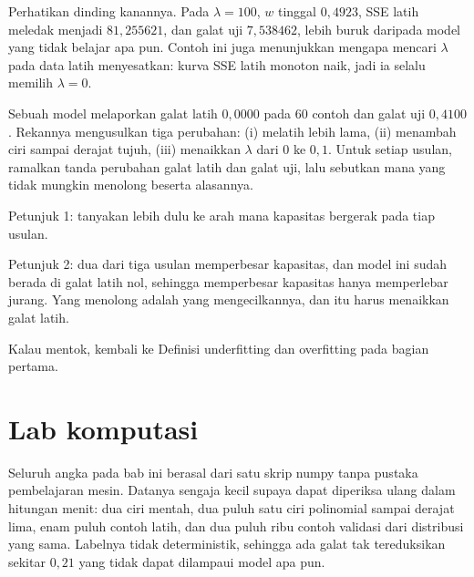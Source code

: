 Perhatikan dinding kanannya. Pada $\lambda=100$, $w$ tinggal $0{,}4923$, SSE latih
meledak menjadi $81{,}255621$, dan galat uji $7{,}538462$, lebih buruk daripada model
yang tidak belajar apa pun. Contoh ini juga menunjukkan mengapa mencari $\lambda$ pada
data latih menyesatkan: kurva SSE latih monoton naik, jadi ia selalu memilih
$\lambda=0$.

\begin{tantangan}
Sebuah model melaporkan galat latih $0{,}0000$ pada $60$ contoh dan galat uji
$0{,}4100$. Rekannya mengusulkan tiga perubahan: (i) melatih lebih lama, (ii) menambah
ciri sampai derajat tujuh, (iii) menaikkan $\lambda$ dari $0$ ke $0{,}1$. Untuk setiap
usulan, ramalkan tanda perubahan galat latih dan galat uji, lalu sebutkan mana yang
tidak mungkin menolong beserta alasannya.

Petunjuk 1: tanyakan lebih dulu ke arah mana kapasitas bergerak pada tiap usulan.

Petunjuk 2: dua dari tiga usulan memperbesar kapasitas, dan model ini sudah berada di
galat latih nol, sehingga memperbesar kapasitas hanya memperlebar jurang. Yang menolong
adalah yang mengecilkannya, dan itu harus menaikkan galat latih.

Kalau mentok, kembali ke Definisi underfitting dan overfitting pada bagian pertama.
\end{tantangan}


\section{Lab komputasi}

Seluruh angka pada bab ini berasal dari satu skrip numpy tanpa pustaka pembelajaran
mesin. Datanya sengaja kecil supaya dapat diperiksa ulang dalam hitungan menit: dua ciri
mentah, dua puluh satu ciri polinomial sampai derajat lima, enam puluh contoh latih, dan
dua puluh ribu contoh validasi dari distribusi yang sama. Labelnya tidak deterministik,
sehingga ada galat tak tereduksikan sekitar $0{,}21$ yang tidak dapat dilampaui model apa
pun.


